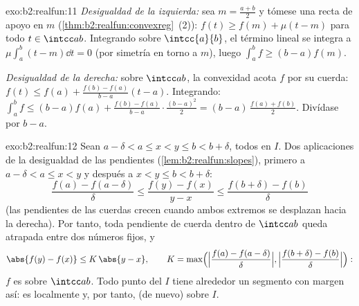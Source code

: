 \begin{solution}{exo:b2:realfun:11}
\emph{Desigualdad de la izquierda:} sea $m = \frac{a+b}2$ y tómese
una recta de apoyo en $m$ (\cref{thm:b2:realfun:convexreg}~(2)):
$f(t) \geq f(m) + \mu(t - m)$ para todo $t \in \intcc ab$.
Integrando sobre $\intcc{a}{b}$, el término lineal se integra a
$\mu\int_a^b(t - m)\dd t = 0$ (por simetría en torno a $m$), luego
$\int_a^b f \geq (b - a)f(m)$.

\emph{Desigualdad de la derecha:} sobre $\intcc ab$, la convexidad
acota $f$ por su cuerda: $f(t) \leq f(a) + \frac{f(b) - f(a)}{b -
a}(t - a)$. Integrando: $\int_a^b f \leq (b-a)f(a) + \frac{f(b) -
f(a)}{b - a}\cdot\frac{(b-a)^2}2 = (b - a)\,\frac{f(a) + f(b)}2$.
Divídase por $b - a$.
\end{solution}

\begin{solution}{exo:b2:realfun:12}
Sean $a - \delta < a \leq x < y \leq b < b + \delta$, todos en $I$.
Dos aplicaciones de la desigualdad de las pendientes
(\cref{lem:b2:realfun:slopes}), primero a $a - \delta < a \leq x <
y$ y después a $x < y \leq b < b + \delta$:
\[
\frac{f(a) - f(a - \delta)}{\delta}
\leq \frac{f(y) - f(x)}{y - x}
\leq \frac{f(b + \delta) - f(b)}{\delta}
\]
(las pendientes de las cuerdas crecen cuando ambos extremos se
desplazan hacia la derecha). Por tanto, toda pendiente de cuerda
dentro de $\intcc ab$ queda atrapada entre dos números fijos, y
\[
\abs{f(y) - f(x)} \leq K\,\abs{y - x},
\qquad
K = \max\Bigl(\Bigl|\frac{f(a) - f(a-\delta)}{\delta}\Bigr|,
\Bigl|\frac{f(b+\delta) - f(b)}{\delta}\Bigr|\Bigr):
\]
$f$ es  sobre $\intcc ab$. Todo punto del  $I$
tiene alrededor un segmento con margen así: es localmente
 y, por tanto, (de nuevo)  sobre $I$.
\end{solution}

